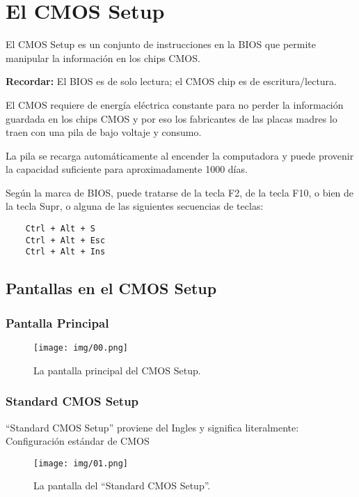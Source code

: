\section{El CMOS Setup}{\label{sec:cmossetup}}

	El CMOS Setup es un conjunto de instrucciones en la BIOS que permite
	manipular la información en los chips CMOS.

	{\bf Recordar:} El BIOS es de solo lectura; el CMOS chip es de escritura/lectura.

	El CMOS requiere de energía eléctrica constante para no perder la
	información guardada en los chips CMOS y por eso los fabricantes de las
	placas madres lo traen con una pila de bajo voltaje y consumo.

	La pila se recarga automáticamente al encender la computadora y puede
	provenir la capacidad suficiente para aproximadamente 1000 días.

	Según la marca de BIOS, puede tratarse de la tecla F2, de la tecla F10, o
	bien de la tecla Supr, o alguna de las siguientes secuencias de teclas: 

	\begin{verbatim}
	Ctrl + Alt + S 
	Ctrl + Alt + Esc 
	Ctrl + Alt + Ins 
	\end{verbatim}

	\newpage
	\subsection{Pantallas en el CMOS Setup}{\label{sub:pantallas en el cmos setup}}

		\subsubsection{Pantalla Principal}{\label{sub:pantalla principal}}
			
			\begin{figure}[H]
				\centering
					\texttt{[image: img/00.png]}
				\caption{La pantalla principal del CMOS Setup.}
			\end{figure}

		\subsubsection{Standard CMOS Setup}{\label{sub:Standard cmos setup}}
	
			``Standard CMOS Setup'' proviene del Ingles y significa literalmente:
			Configuración estándar de CMOS
			\begin{figure}[H]
				\centering
					\texttt{[image: img/01.png]}
				\caption{La pantalla del ``Standard CMOS Setup''.}
			\end{figure}
			
